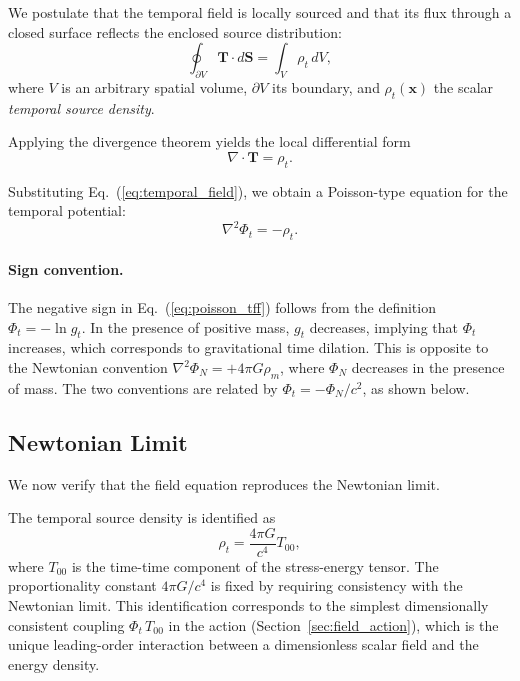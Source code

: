 \documentclass[12pt]{article}
\begin{document}
We postulate that the temporal field is locally sourced and that its flux through a closed surface reflects the enclosed source distribution:
$$
\oint_{\partial V} \mathbf{T} \cdot d\mathbf{S} = \int_V \rho_t \, dV ,
$$
where $V$ is an arbitrary spatial volume, $\partial V$ its boundary, and $\rho_t(\mathbf{x})$ the scalar \emph{temporal source density}.

Applying the divergence theorem yields the local differential form
\begin{equation}
\nabla \cdot \mathbf{T} = \rho_t .
\label{eq:gauss_tff}
\end{equation}

Substituting Eq.~(\ref{eq:temporal_field}), we obtain a Poisson-type equation for the temporal potential:
\begin{equation}
\nabla^2 \Phi_t = - \rho_t .
\label{eq:poisson_tff}
\end{equation}

\paragraph{Sign convention.}
The negative sign in Eq.~(\ref{eq:poisson_tff}) follows from the definition $\Phi_t = -\ln g_t$. In the presence of positive mass, $g_t$ decreases, implying that $\Phi_t$ increases, which corresponds to gravitational time dilation. This is opposite to the Newtonian convention $\nabla^2\Phi_N = +4\pi G\rho_m$, where $\Phi_N$ decreases in the presence of mass. The two conventions are related by $\Phi_t = -\Phi_N/c^2$, as shown below.

\subsection{Newtonian Limit}
\label{sec:newtonian_field}

We now verify that the field equation reproduces the Newtonian limit.

The temporal source density is identified as
\begin{equation}
\rho_t = \frac{4\pi G}{c^4} T_{00} ,
\label{eq:temporal_source}
\end{equation}
where $T_{00}$ is the time-time component of the stress-energy tensor. The proportionality constant $4\pi G/c^4$ is fixed by requiring consistency with the Newtonian limit. This identification corresponds to the simplest dimensionally consistent coupling $\Phi_t\, T_{00}$ in the action (Section~\ref{sec:field_action}), which is the unique leading-order interaction between a dimensionless scalar field and the energy density.
\end{document}
